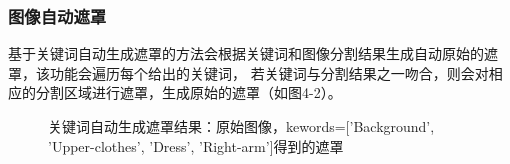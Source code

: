 \documentclass[a4paper,AutoFakeBold,oneside,12pt]{book}
\begin{document}
\subsubsection{图像自动遮罩}
基于关键词自动生成遮罩的方法会根据关键词和图像分割结果生成自动原始的遮罩，该功能会遍历每个给出的关键词，
若关键词与分割结果之一吻合，则会对相应的分割区域进行遮罩，生成原始的遮罩（如图4-2）。
\begin{figure}[!htbp]
    \centering
    \quad %
    \caption{关键词自动生成遮罩结果：\protect{}原始图像，\protect{}kewords=['Background', 'Upper-clothes', 'Dress', 'Right-arm']得到的遮罩} %
    \label{Fig:SegmentKeywords} %
\end{figure}
\end{document}
